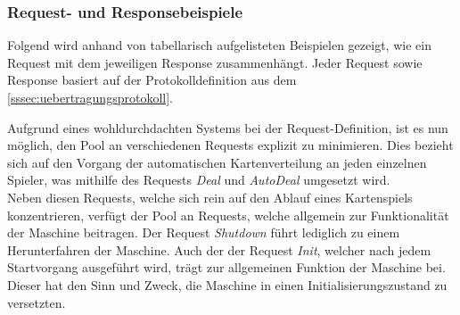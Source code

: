 \subsubsection{Request- und Responsebeispiele}
Folgend wird anhand von tabellarisch aufgelisteten Beispielen gezeigt, wie ein Request mit dem jeweiligen Response zusammenhängt.
Jeder Request sowie Response basiert auf der Protokolldefinition aus dem \autoref{sssec:uebertragungsprotokoll}.
\begin{table}[H]
\centering
{}
\caption{Request- und Responsebeispiele tabellarisch dargestellt}
\end{table}
Aufgrund eines wohldurchdachten Systems bei der Request-Definition, ist es nun möglich, den Pool an verschiedenen Requests explizit zu minimieren.
Dies bezieht sich auf den Vorgang der automatischen Kartenverteilung an jeden einzelnen Spieler, was mithilfe des Requests \textit{Deal} und \textit{AutoDeal} umgesetzt wird.\\
Neben diesen Requests, welche sich rein auf den Ablauf eines Kartenspiels konzentrieren, verfügt der Pool an Requests, welche allgemein zur Funktionalität der Maschine beitragen.
Der Request \textit{Shutdown} führt lediglich zu einem Herunterfahren der Maschine.
Auch der der Request \textit{Init}, welcher nach jedem Startvorgang ausgeführt wird, trägt zur allgemeinen Funktion der Maschine bei.
Dieser hat den Sinn und Zweck, die Maschine in einen Initialisierungszustand zu versetzten.\\
